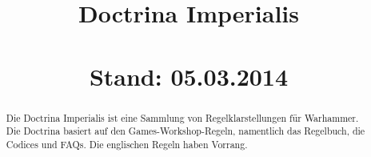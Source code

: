\documentclass[a4paper,10pt, parskip, german]{scrartcl}
\title{
Doctrina Imperialis \\
\normalsize{~\\ Stand: 05.03.2014}
}
\author{}
\date{\vspace{-5ex}}
\begin{document}
\sffamily

\maketitle

\begin{abstract}
Die Doctrina Imperialis ist eine Sammlung von Regelklarstellungen für
Warhammer.
Die Doctrina basiert auf den Games-Workshop-Regeln, namentlich das
Regelbuch, die Codices und FAQs. Die englischen Regeln haben Vorrang.
\end{abstract}

\tableofcontents

\newpage

%
%


\newpage
%
%


\newpage
%
%

\end{document}
